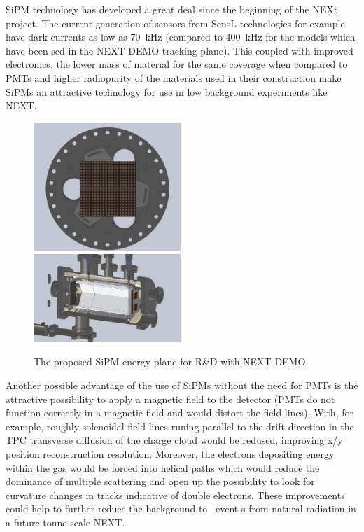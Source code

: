 \documentclass[a4paper,11pt,oneside]{article}
\begin{document}
SiPM technology has developed a great deal since the beginning of the
NEXt project. The current generation of sensors from SensL
technologies for example have dark currents as low as 70~kHz (compared
to 400~kHz for the models which have been sed in the NEXT-DEMO
tracking plane). This coupled
with improved electronics, the lower mass of material for the same
coverage when compared to PMTs and higher radiopurity of
the materials used in their construction make SiPMs an attractive
technology for use in low background experiments like NEXT.
\begin{figure}
  \begin{center}
    \includegraphics[width=0.495\textwidth]{img/siliEng}
    \includegraphics[width=0.495\textwidth]{img/siliNEXT}
  \end{center}
  \caption{The proposed SiPM energy plane for R\&D with NEXT-DEMO.}
  \label{fig:siliNEXT}
\end{figure}
Another possible advantage of the use of SiPMs without the need for
PMTs is the attractive possibility to apply a magnetic field to the
detector (PMTs do not function correctly in a magnetic field and would
distort the field lines). With, for example, roughly solenoidal field
lines runing parallel to the drift direction in the TPC transverse
diffusion of the charge cloud would be redused, improving x/y position
reconstruction resolution. Moreover, the electrons depositing energy within
the gas would be forced into helical paths which would reduce the
dominance of multiple scattering and open up the possibility to look
for curvature changes in tracks indicative of double electrons. These
improvements could help to further reduce the background to \bbonu\
event s from natural radiation in a future tonne scale NEXT.
\end{document}
